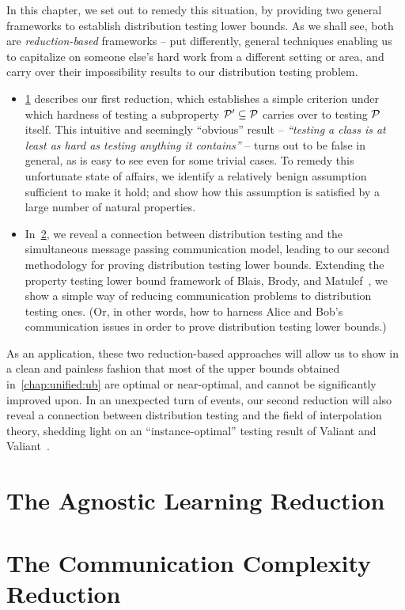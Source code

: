 In this chapter, we set out to remedy this situation, by providing two general frameworks to establish distribution testing lower bounds. As we shall see, both are \emph{reduction-based} frameworks -- put differently, general techniques enabling us to capitalize on someone else's hard work from a different setting or area, and carry over their impossibility results to our distribution testing problem.
\begin{itemize}
  \item \cref{sec:learningreductions} describes our first reduction, which establishes a simple criterion under which hardness of testing a subproperty $\mathcal{P}'\subseteq \mathcal{P}$ carries over to testing $\mathcal{P}$ itself. This intuitive and seemingly ``obvious'' result -- \emph{``testing a class is at least as hard as testing anything it contains''} -- turns out to be false in general, as is easy to see even for some trivial cases. To remedy this unfortunate state of affairs, we identify a relatively benign assumption sufficient to make it hold; and show how this assumption is satisfied by a large number of natural properties.

  \item In~\cref{sec:communication}, we reveal a connection between distribution testing and the simultaneous message passing communication model, leading to our second methodology for proving distribution testing lower bounds. Extending the property testing lower bound framework of Blais, Brody, and Matulef~\cite{BBM:12}, we show a simple way of reducing communication problems to distribution testing ones. (Or, in other words, how to harness Alice and Bob's communication issues in order to prove distribution testing lower bounds.)
\end{itemize}
As an application, these two reduction-based approaches will allow us to show in a clean and painless fashion that most of the upper bounds obtained in~\cref{chap:unified:ub} are optimal or near-optimal, and cannot be significantly improved upon. In an unexpected turn of events, our second reduction will also reveal a connection between distribution testing and the field of interpolation theory, shedding light on an ``instance-optimal'' testing result of Valiant and Valiant~\cite{VV:14}.


\section{The Agnostic Learning Reduction}\label{sec:learningreductions}


\section{The Communication Complexity Reduction}\label{sec:communication}

